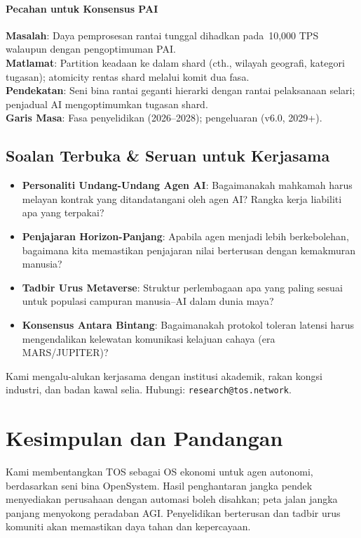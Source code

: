 \documentclass[11pt]{article}
\begin{document}
\paragraph{Pecahan untuk Konsensus PAI}
\textbf{Masalah}: Daya pemprosesan rantai tunggal dihadkan pada~10,000 TPS walaupun dengan pengoptimuman PAI.\\
\textbf{Matlamat}: Partition keadaan ke dalam shard (cth., wilayah geografi, kategori tugasan); atomicity rentas shard melalui komit dua fasa.\\
\textbf{Pendekatan}: Seni bina rantai geganti hierarki dengan rantai pelaksanaan selari; penjadual AI mengoptimumkan tugasan shard.\\
\textbf{Garis Masa}: Fasa penyelidikan (2026--2028); pengeluaran (v6.0, 2029+).

\subsection{Soalan Terbuka \& Seruan untuk Kerjasama}

\begin{itemize}[noitemsep]
  \item \textbf{Personaliti Undang-Undang Agen AI}: Bagaimanakah mahkamah harus melayan kontrak yang ditandatangani oleh agen AI? Rangka kerja liabiliti apa yang terpakai?
  \item \textbf{Penjajaran Horizon-Panjang}: Apabila agen menjadi lebih berkebolehan, bagaimana kita memastikan penjajaran nilai berterusan dengan kemakmuran manusia?
  \item \textbf{Tadbir Urus Metaverse}: Struktur perlembagaan apa yang paling sesuai untuk populasi campuran manusia--AI dalam dunia maya?
  \item \textbf{Konsensus Antara Bintang}: Bagaimanakah protokol toleran latensi harus mengendalikan kelewatan komunikasi kelajuan cahaya (era MARS/JUPITER)?
\end{itemize}

Kami mengalu-alukan kerjasama dengan institusi akademik, rakan kongsi industri, dan badan kawal selia. Hubungi: \texttt{research@tos.network}.

\section{Kesimpulan dan Pandangan}
Kami membentangkan TOS sebagai OS ekonomi untuk agen autonomi, berdasarkan seni bina OpenSystem. Hasil penghantaran jangka pendek menyediakan perusahaan dengan automasi boleh disahkan; peta jalan jangka panjang menyokong peradaban AGI. Penyelidikan berterusan dan tadbir urus komuniti akan memastikan daya tahan dan kepercayaan.
\end{document}
